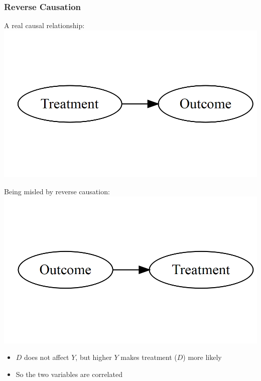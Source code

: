 \documentclass[xcolor=x11names,compress]{beamer}\usepackage[]{graphicx}\usepackage[]{color}
\makeatletter
\def\maxwidth{ %
  \ifdim\Gin@nat@width>\linewidth
    \linewidth
  \else
    \Gin@nat@width
  \fi
}
\newenvironment{knitrout}{}{} %
\renewcommand{\(}{\begin{columns}}
\renewcommand{\)}{\end{columns}}
\newcommand{\<}[1]{\begin{column}{#1}}
\renewcommand{\>}{\end{column}}
\makeatother
\begin{document}
\begin{frame}
\frametitle{Reverse Causation}
\begin{multicols}{2}
A real causal relationship:
\begin{knitrout}
\color{fgcolor}
\includegraphics[width=\maxwidth]{figure/explanation5-1} 

\end{knitrout}
\columnbreak
Being misled by reverse causation:
\begin{knitrout}
\color{fgcolor}
\includegraphics[width=\maxwidth]{figure/explanation6-1} 

\end{knitrout}
\end{multicols}
\begin{itemize}
\pause
\item $D$ does not affect $Y$, but higher $Y$ makes treatment ($D$) more likely
\pause
\item So the two variables are correlated
\end{itemize}
\end{frame}
\end{document}

